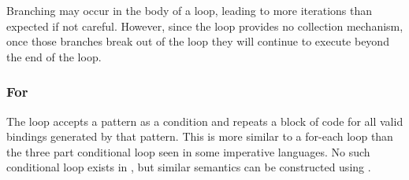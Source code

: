 Branching may occur in the body of a  loop, leading to more iterations
than expected if not careful. However, since the  loop provides no collection
mechanism, once those branches break out of the loop they will continue to execute
beyond the end of the loop.

\begin{prooftree}
\end{prooftree}

\begin{prooftree}
\end{prooftree}

\subsubsection{For}

The  loop accepts a pattern as a condition and repeats a block of code
for all valid bindings generated by that pattern. This is more similar to a for-each
loop than the three part conditional loop seen in some imperative languages.
No such conditional  loop exists in \Trilogy{}, but similar semantics can
be constructed using .

\begin{bnf*}
\end{bnf*}

